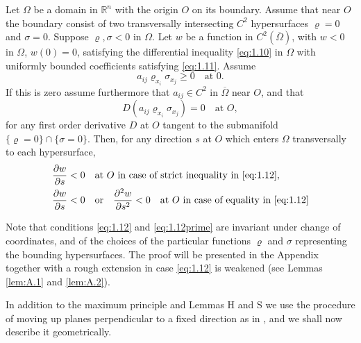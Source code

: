 \begin{lemmaS}
  Let $\Omega$ be a domain in $\mathbb{R}^n$ with the origin $O$ on its boundary.
  Assume that near $O$ the boundary consist of two transversally intersecting
  $C^2$ hypersurfaces $\varrho = 0$ and $\sigma = 0$.
  Suppose $\varrho,\sigma<0$ in $\Omega$. Let $w$ be a function in $C^2(\overline{\Omega})$,
  with $w<0$ in $\Omega$, $w(0)=0$, satisfying the differential inequality \eqref{eq:1.10}
  in $\Omega$ with uniformly bounded coefficients satisfying \eqref{eq:1.11}. Assume
  \begin{equation}\label{eq:1.12}
    a_{ij}\varrho_{x_i}\sigma_{x_j} \geq 0\quad \text{at } 0.
  \end{equation}
  If this is zero assume furthermore that $a_{ij}\in C^2$ in $\overline{\Omega}$
  near $O$, and that
  \begin{equation}\label{eq:1.12prime}
    D(a_{ij}\varrho_{x_i}\sigma_{x_j}) = 0 \quad \text{at } O, \tag{$1.12'$}
  \end{equation}
  for any first order derivative $D$ at $O$ tangent to the submanifold
  $\{\varrho=0\}\cap \{\sigma=0\}$.
  Then, for any direction $s$ at $O$ which enters $\Omega$ transversally to each hypersurface,
  \begin{equation}\label{eq:1.13}
    \begin{aligned}
      & \frac{\partial w}{\partial s} < 0 \quad\text{at } O 
        \text{ in case of strict inequality in \eqref{eq:1.12}}, \\
      & \frac{\partial w}{\partial s} < 0\quad \text{or} \quad
        \frac{\partial^2w}{\partial s^2} < 0\quad
        \text{at } O \text{ in case of equality in \eqref{eq:1.12}}
    \end{aligned}
  \end{equation}
\end{lemmaS}

Note that conditions \eqref{eq:1.12} and \eqref{eq:1.12prime} are invariant under
change of coordinates, and of the choices of the particular functions $\varrho$ 
and $\sigma$ representing the bounding hypersurfaces.
The proof will be presented in the Appendix together with a rough extension
in case \eqref{eq:1.12} is weakened (see Lemmas \ref{lem:A.1} and \ref{lem:A.2}).

In addition to the maximum principle and Lemmas H and S
we use the procedure of moving up planes perpendicular to a fixed direction as in \cite{serrin_symmetry_1971},
and we shall now describe it geometrically.

